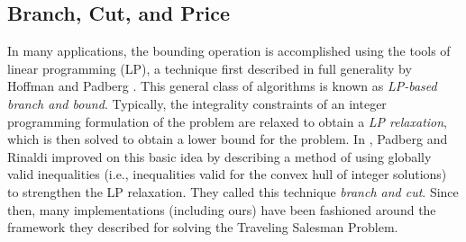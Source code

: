 \subsection{Branch, Cut, and Price}
\label{branchandcut}

In many applications, the bounding operation is accomplished using the
tools of linear programming (LP), a technique first described in full
generality by Hoffman and Padberg \cite{H&P}. This general class of
algorithms is known as {\em LP-based branch and bound}. Typically, the
integrality constraints of an integer programming formulation of the
problem are relaxed to obtain a {\em LP relaxation}, which is then
solved to obtain a lower bound for the problem. In \cite{P&R},
Padberg and Rinaldi improved on this basic idea by describing a method
of using globally valid inequalities (i.e., inequalities valid for the
convex hull of integer solutions) to strengthen the LP relaxation.
They called this technique {\em branch and cut}. Since then, many
implementations (including ours) have been fashioned around the
framework they described for solving the Traveling Salesman Problem.

